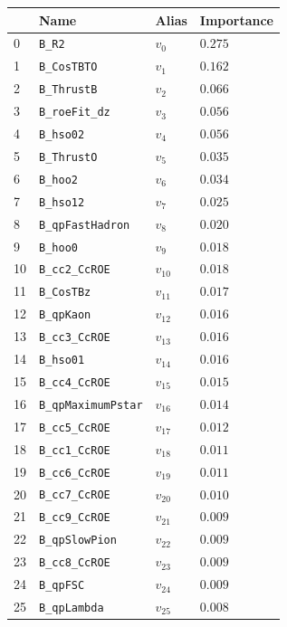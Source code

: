 \begin{longtable}{| p{} | p{} | p{} |p{} |}
\hline
& Name & Alias & Importance \\ \hline
0 &\texttt{B\_R2} & $v_{0}$ & $0.275$ \\ \hline
1 &\texttt{B\_CosTBTO} & $v_{1}$ & $0.162$ \\ \hline
2 &\texttt{B\_ThrustB} & $v_{2}$ & $0.066$ \\ \hline
3 &\texttt{B\_roeFit\_dz} & $v_{3}$ & $0.056$ \\ \hline
4 &\texttt{B\_hso02} & $v_{4}$ & $0.056$ \\ \hline
5 &\texttt{B\_ThrustO} & $v_{5}$ & $0.035$ \\ \hline
6 &\texttt{B\_hoo2} & $v_{6}$ & $0.034$ \\ \hline
7 &\texttt{B\_hso12} & $v_{7}$ & $0.025$ \\ \hline
8 &\texttt{B\_qpFastHadron} & $v_{8}$ & $0.020$ \\ \hline
9 &\texttt{B\_hoo0} & $v_{9}$ & $0.018$ \\ \hline
10 &\texttt{B\_cc2\_CcROE} & $v_{10}$ & $0.018$ \\ \hline
11 &\texttt{B\_CosTBz} & $v_{11}$ & $0.017$ \\ \hline
12 &\texttt{B\_qpKaon} & $v_{12}$ & $0.016$ \\ \hline
13 &\texttt{B\_cc3\_CcROE} & $v_{13}$ & $0.016$ \\ \hline
14 &\texttt{B\_hso01} & $v_{14}$ & $0.016$ \\ \hline
15 &\texttt{B\_cc4\_CcROE} & $v_{15}$ & $0.015$ \\ \hline
16 &\texttt{B\_qpMaximumPstar} & $v_{16}$ & $0.014$ \\ \hline
17 &\texttt{B\_cc5\_CcROE} & $v_{17}$ & $0.012$ \\ \hline
18 &\texttt{B\_cc1\_CcROE} & $v_{18}$ & $0.011$ \\ \hline
19 &\texttt{B\_cc6\_CcROE} & $v_{19}$ & $0.011$ \\ \hline
20 &\texttt{B\_cc7\_CcROE} & $v_{20}$ & $0.010$ \\ \hline
21 &\texttt{B\_cc9\_CcROE} & $v_{21}$ & $0.009$ \\ \hline
22 &\texttt{B\_qpSlowPion} & $v_{22}$ & $0.009$ \\ \hline
23 &\texttt{B\_cc8\_CcROE} & $v_{23}$ & $0.009$ \\ \hline
24 &\texttt{B\_qpFSC} & $v_{24}$ & $0.009$ \\ \hline
25 &\texttt{B\_qpLambda} & $v_{25}$ & $0.008$ \\ \hline

\end{longtable}
